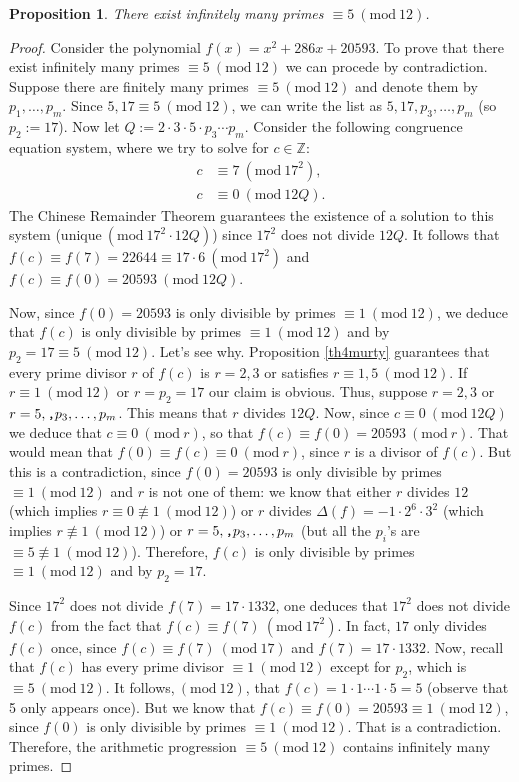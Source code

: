 \documentclass[a4paper, 12pt]{article}
\newtheorem{proposition}[theorem]{Proposition}
\theoremstyle{definition}
\theoremstyle{remark}
\newcommand{\Z}{\ensuremath{\mathbb{Z}}}
\newcommand{\Mod}[1]{\ (\mathrm{mod}\ #1)} %
\begin{document}
\begin{proposition}
There exist infinitely many primes $\equiv 5\Mod{12}$.
\end{proposition}
\begin{proof}
Consider the polynomial $f(x)=x^{2} + 286 x + 20593$. To prove that there exist infinitely many primes $\equiv 5 \Mod{12}$ we can procede by contradiction. Suppose there are finitely many primes $\equiv 5\Mod{12}$ and denote them by $p_1,\dots,p_m$. Since $5, 17 \equiv 5 \Mod{12}$, we can write the list as $5, 17, p_{3},\dots, p_m$ (so $p_{2}:=17$). Now let $Q:={2 \cdot 3 \cdot 5}\cdot p_{3}\cdots p_m$. Consider the following congruence equation system, where we try to solve for $c\in\Z$:
	\begin{align*}
		c&\equiv 7\Mod{17^2},\\
		c&\equiv 0\Mod{12Q}.
	\end{align*}
The Chinese Remainder Theorem guarantees the existence of a solution to this system (unique$\Mod{17^2\cdot12Q}$) since $17^2$ does not divide $12Q$. It follows that $f(c)\equiv f(7)=22644\equiv 17\cdot6\Mod{17^2}$ and $f(c)\equiv f(0)=20593\Mod{12Q}$. 

Now, since $f(0)=20593$ is only divisible by primes $\equiv 1\Mod{12}$, we deduce that $f(c)$ is only divisible by primes $\equiv 1\Mod{12}$ and by $p_{2}=17\equiv 5\Mod{12}$. Let's see why. Proposition \ref{th4murty} guarantees that every prime divisor $r$ of $f(c)$ is $r=2, 3$ or satisfies $r\equiv 1,5\Mod{12}$. If $r\equiv 1\Mod{12}$ or $r=p_{2}=17$ our claim is obvious. Thus, suppose $r=2, 3$ or $r=5, \text{\texttt{,}} p_{3},\dots,p_m$. This means that $r$ divides $12Q$. Now, since $c\equiv 0\Mod{12Q}$ we deduce that $c\equiv 0\Mod{r}$, so that $f(c)\equiv f(0)=20593\Mod{r}$. That would mean that $f(0)\equiv f(c)\equiv 0\Mod{r}$, since $r$ is a divisor of $f(c)$. But this is a contradiction, since $f(0)=20593$ is only divisible by primes $\equiv 1\Mod{12}$ and $r$ is not one of them: we know that either $r$ divides $12$ (which implies $r\equiv 0\not\equiv 1\Mod{12}$) or $r$ divides $\Delta(f)=-1 \cdot 2^{6} \cdot 3^{2}$ (which implies $r\not\equiv 1\Mod{12}$) or $r=5, \text{\texttt{,}} p_{3},\dots,p_m$ (but all the $p_i$'s are $\equiv 5 \not\equiv 1\Mod{12}$). Therefore, $f(c)$ is only divisible by primes $\equiv 1\Mod{12}$ and by $p_{2}=17$.

Since $17^2$ does not divide $f(7)=17\cdot1332$, one deduces that $17^2$ does not divide $f(c)$ from the fact that $f(c)\equiv f(7)\Mod{17^2}$. In fact, $17$ only divides $f(c)$ once, since $f(c)\equiv f(7)\Mod{17}$ and $f(7)=17\cdot1332$. Now, recall that $f(c)$ has every prime divisor $\equiv 1 \Mod{12}$ except for $p_{2}$, which is $\equiv 5\Mod{12}$. It follows,$\Mod{12}$, that $f(c)=1\cdot1\cdots 1\cdot5=5$ (observe that 5 only appears once). But we know that $f(c)\equiv f(0)=20593\equiv 1\Mod{12}$, since $f(0)$ is only divisible by primes $\equiv 1\Mod{12}$. That is a contradiction. Therefore, the arithmetic progression $\equiv 5\Mod{12}$ contains infinitely many primes.
\end{proof}

\newpage

%
%
\end{document}
